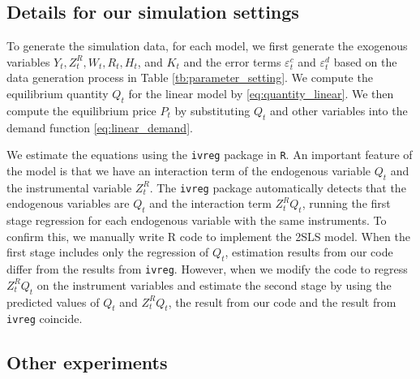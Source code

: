 \documentclass[11pt, a4paper]{article}
\begin{document}
\subsection{Details for our simulation settings}

To generate the simulation data, for each model, we first generate the exogenous variables $Y_t, Z^{R}_{t}, W_t, R_{t}, H_t$, and $K_t$ and the error terms $\varepsilon_{t}^c$ and $\varepsilon_{t}^d$ based on the data generation process in Table \ref{tb:parameter_setting}.
We compute the equilibrium quantity $Q_{t}$ for the linear model by \eqref{eq:quantity_linear}.
We then compute the equilibrium price $P_t$ by substituting $Q_{t}$ and other variables into the demand function \eqref{eq:linear_demand}.

We estimate the equations using the \texttt{ivreg} package in \texttt{R}.
An important feature of the model is that we have an interaction term of the endogenous variable $Q_{t}$ and the instrumental variable $Z^{R}_{t}$.
The \texttt{ivreg} package automatically detects that the endogenous variables are $Q_{t}$ and the interaction term $Z^{R}_{t}Q_{t}$, running the first stage regression for each endogenous variable with the same instruments. To confirm this, we manually write R code to implement the 2SLS model. 
When the first stage includes only the regression of $Q_{t}$, estimation results from our code differ from the results from \texttt{ivreg}. 
However, when we modify the code to regress $Z^{R}_{t}Q_{t}$ on the instrument variables and estimate the second stage by using the predicted values of $Q_{t}$ and $Z^{R}_{t}Q_{t}$, the result from our code and the result from \texttt{ivreg} coincide.


\subsection{Other experiments}
\end{document}
